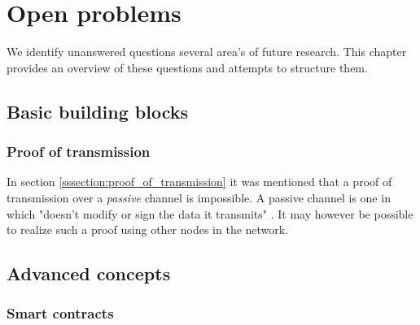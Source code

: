 \chapter{Open problems}
We identify unanswered questions several area's of future research. This chapter provides an overview of these questions and attempts to structure them.

\section{Basic building blocks}
\subsection{Proof of transmission}
In section \ref{sssection:proof_of_transmission} it was mentioned that a proof of transmission over a \emph{passive} channel is impossible. A passive channel is one in which "doesn't modify or sign the data it transmits" \cite{kravchenko}. It may however be possible to realize such a proof using other nodes in the network.

\section{Advanced concepts}
\subsection{Smart contracts}

